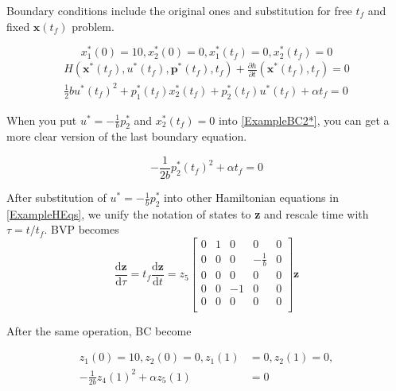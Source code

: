 \documentclass[twoside]{article}
\begin{document}
Boundary conditions include the original ones and substitution for free $t_f$ and fixed $\textbf{x}(t_f)$ problem.

\begin{equation}\label{ExampleBC1*}
x_1^*(0) = 10, x_2^*(0) = 0, x_1^*(t_f) = 0, x_2^*(t_f) = 0
\end{equation}
\begin{equation}\label{ExampleBC2*}
\begin{split}
H(\textbf{x}^*(t_f), u^*(t_f), \textbf{p}^*(t_f), t_f)+\frac{\partial{h}}{\partial{t}}(\textbf{x}^*(t_f),t_f) = 0 \\
\frac{1}{2}bu^*(t_f)^2 + p_1^*(t_f)x_2^*(t_f)+p_2^*(t_f)u^*(t_f) + \alpha t_f = 0
\end{split}
\end{equation}

When you put $u^* = -\frac{1}{b}p_2^*$ and $x_2^*(t_f) = 0$ into \eqref{ExampleBC2*}, you can get a more clear version of the last boundary equation.

\begin{equation}\label{ExampleBC2*Clear}
-\frac{1}{2b}p_2^*(t_f)^2 + \alpha t_f = 0
\end{equation}

After substitution of $u^* = -\frac{1}{b}p_2^*$ into other Hamiltonian equations in \eqref{ExampleHEqs}, we unify the notation of states to \textbf{z} and rescale time with $\tau = t/t_f$. BVP becomes
\begin{equation}\label{FinalBVP}
\frac{\mathrm{d}\textbf{z}}{\mathrm{d}\tau} = t_f\frac{\mathrm{d}\textbf{z}}{\mathrm{d}t} 
= z_5\begin{bmatrix}
    0 & 1 & 0  & 0                & 0 \\
    0 & 0 & 0  & -\frac{1}{b} & 0 \\
    0 & 0 & 0  & 0                & 0 \\
    0 & 0 & -1 & 0                & 0 \\
    0 & 0 & 0  & 0                & 0 \\
\end{bmatrix} \textbf{z}
\end{equation}

After the same operation, BC become

\begin{equation}\label{FinalBC}
\begin{split}
z_1(0) = 10, z_2(0) = 0, z_1(1) &= 0, z_2(1) = 0, \\
-\frac{1}{2b}z_4(1)^2 + \alpha z_5(1) &= 0
\end{split}
\end{equation}
\end{document}
